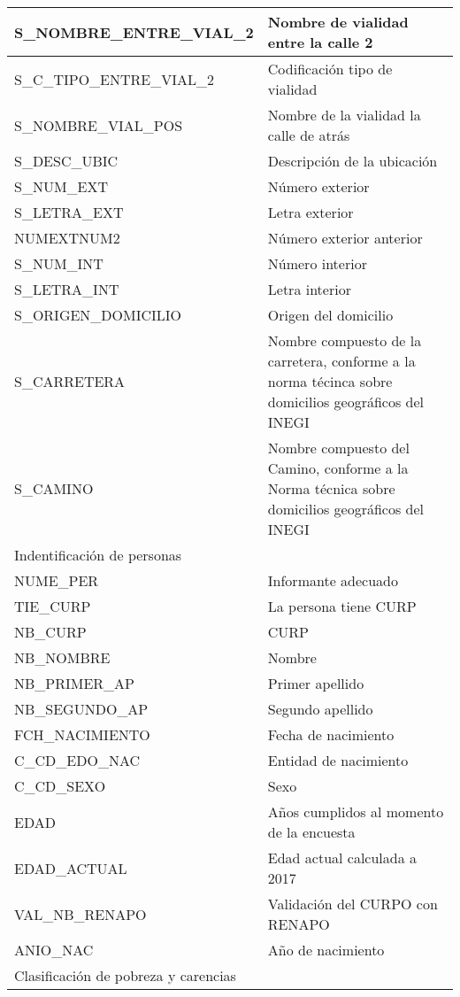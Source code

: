 \begin{longtable}{|p{8cm}|p{8cm}|}
    \hline
    S\_NOMBRE\_ENTRE\_VIAL\_2 & Nombre de vialidad entre la calle 2 \\
    \hline
    S\_C\_TIPO\_ENTRE\_VIAL\_2 & Codificación tipo de vialidad \\
    \hline
    S\_NOMBRE\_VIAL\_POS & Nombre de la vialidad la calle de atrás \\
    \hline
    S\_DESC\_UBIC & Descripción de la ubicación \\
    \hline
    S\_NUM\_EXT & Número exterior \\
    \hline
    S\_LETRA\_EXT & Letra exterior \\
    \hline
    NUMEXTNUM2 & Número exterior anterior \\
    \hline
    S\_NUM\_INT & Número interior \\
    \hline
    S\_LETRA\_INT & Letra interior \\
    \hline
    S\_ORIGEN\_DOMICILIO & Origen del domicilio \\
    \hline
    S\_CARRETERA & Nombre compuesto de la carretera, conforme a la norma técinca sobre domicilios geográficos del INEGI \\
    \hline
    S\_CAMINO & Nombre compuesto del Camino, conforme a la Norma técnica sobre domicilios geográficos del INEGI \\
    \hline
    \hline
    \multicolumn{2}{l}{Indentificación de personas}\\
    \hline
    NUME\_PER & Informante adecuado \\
    \hline
    TIE_CURP & La persona tiene CURP \\
    \hline
    NB_CURP & CURP \\
    \hline
    NB_NOMBRE &  Nombre \\
    \hline
    NB_PRIMER_AP & Primer apellido \\
    \hline
    NB_SEGUNDO_AP & Segundo apellido \\
    \hline
    FCH_NACIMIENTO & Fecha de nacimiento \\
    \hline
    C_CD_EDO_NAC & Entidad de nacimiento \\
    \hline
    C_CD_SEXO & Sexo \\
    \hline
    EDAD & Años cumplidos al momento de la encuesta \\
    \hline
    EDAD_ACTUAL & Edad actual calculada a 2017 \\
    \hline
    VAL_NB_RENAPO & Validación del CURPO con RENAPO \\
    \hline
    ANIO_NAC & Año de nacimiento \\
    \hline
    \hline
    \multicolumn{2}{l}{Clasificación de pobreza y carencias}\\



\end{longtable}
\label{tab:varsocioe}
